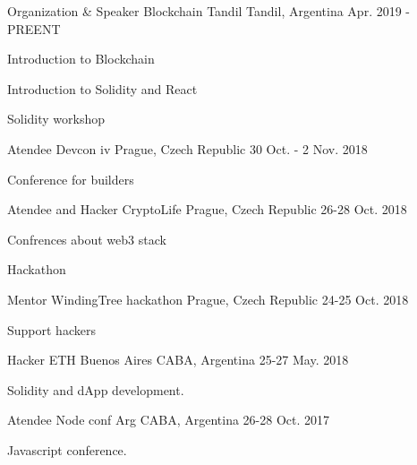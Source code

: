 \begin{cventries}
\cventry
{Organization \& Speaker} %
{Blockchain Tandil} %
{Tandil, Argentina} %
{Apr. 2019 - PREENT} %
{ %
\begin{cvitems}
\item {Introduction to Blockchain}
\item {Introduction to Solidity and React}
\item {Solidity workshop}
\end{cvitems}
}
\cventry
{Atendee} %
{Devcon iv} %
{Prague, Czech Republic} %
{30 Oct. - 2 Nov. 2018} %
{ %
\begin{cvitems}
\item {Conference for builders}
\end{cvitems}
}
\cventry
{Atendee and Hacker} %
{CryptoLife} %
{Prague, Czech Republic} %
{26-28 Oct. 2018} %
{ %
\begin{cvitems}
\item {Confrences about web3 stack}
\item {Hackathon}
\end{cvitems}
}
\cventry
{Mentor} %
{WindingTree hackathon} %
{Prague, Czech Republic} %
{24-25 Oct. 2018} %
{ %
\begin{cvitems}
\item {Support hackers}
\end{cvitems}
}
\cventry
{Hacker} %
{ETH Buenos Aires} %
{CABA, Argentina} %
{25-27 May. 2018} %
{ %
\begin{cvitems}
\item {Solidity and dApp development.}
\end{cvitems}
}
\cventry
{Atendee} %
{Node conf Arg} %
{CABA, Argentina} %
{26-28 Oct. 2017} %
{ %
\begin{cvitems}
\item {Javascript conference.}
\end{cvitems}
}
\end{cventries}
